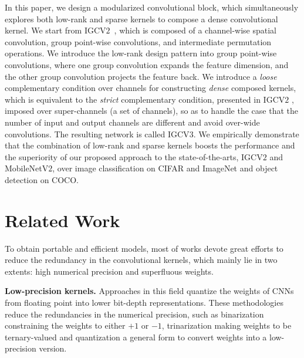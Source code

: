 \documentclass{bmvc2k}
\begin{document}
	In this paper,
	we design a modularized convolutional block,
	which simultaneously explores both low-rank and sparse kernels
	to compose a dense convolutional kernel.
	We start from IGCV$2$~\cite{ISSC18},
	which is composed of a channel-wise spatial convolution,
	group point-wise convolutions,
	and intermediate permutation operations.
	We introduce the low-rank design pattern
	into group point-wise convolutions,
	where one group convolution expands the feature dimension,
	and the other group convolution projects the feature back.
	We introduce a \emph{loose} complementary condition over channels for constructing \emph{dense} composed kernels,
	which is equivalent to the \emph{strict} complementary condition, presented in IGCV$2$ \cite{ISSC18},
	imposed over super-channels (a set of channels),
	so as to handle the case
	that the number of input and output channels are different
	and avoid over-wide convolutions.
	The resulting network is called IGCV$3$.
	We empirically demonstrate that the combination of low-rank and sparse kernels boosts the performance
	and the superiority of our proposed approach
	to the state-of-the-arts, IGCV$2$ and MobileNetV$2$,
	over image classification on CIFAR and ImageNet
	and object detection on COCO.

	\section{Related Work}

	To obtain portable and efficient models, most of works devote great efforts to reduce the redundancy in the convolutional kernels, which mainly lie in two extents: high numerical precision and superfluous weights.


	\noindent\textbf{Low-precision kernels.}
	Approaches in this field quantize the weights of CNNs from floating point into lower bit-depth representations. These methodologies reduce the redundancies in the numerical precision, such as binarization \cite{courbariaux2016binarized} constraining the weights to either $+1$ or $-1$, trinarization \cite{li2016ternary,zhou2016dorefa,zhu2016trained} making weights to be ternary-valued and quantization \cite{HanMD15,zhou2017incremental} a general form to convert weights into a low-precision version.
\end{document}
